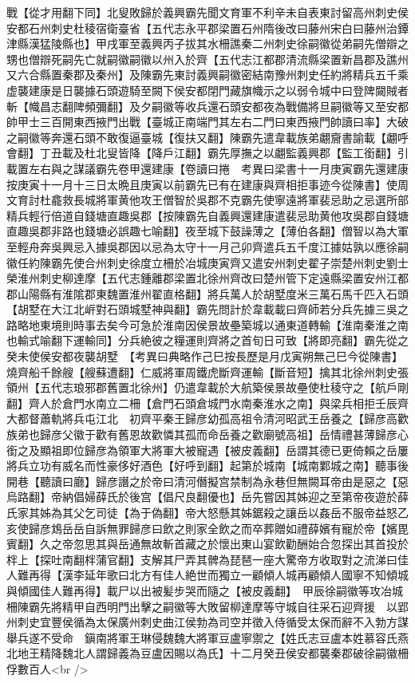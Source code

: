 戰【從才用翻下同】北叟敗歸於義興霸先聞文育軍不利辛未自表東討留高州刺史侯安都石州刺史杜稜宿衛臺省【五代志永平郡梁置石州隋後改曰藤州宋白曰藤州治鐔津縣漢猛陵縣也】甲戌軍至義興丙子拔其水柵譙秦二州刺史徐嗣徽從弟嗣先僧辯之甥也僧辯死嗣先亡就嗣徽嗣徽以州入於齊【五代志江都郡清流縣梁置新昌郡及譙州又六合縣置秦郡及秦州】及陳霸先東討義興嗣徽密結南豫州刺史任約將精兵五千乘虚襲建康是日襲據石頭遊騎至闕下侯安都閉門藏旗幟示之以弱令城中曰登陴闚賊者斬【幟昌志翻陴頻彌翻】及夕嗣徽等收兵還石頭安都夜為戰備將旦嗣徽等又至安都帥甲士三百開東西掖門出戰【臺城正南端門其左右二門曰東西掖門帥讀曰率】大破之嗣徽等奔還石頭不敢復逼臺城【復扶又翻】陳霸先遣韋載族弟翽齎書諭載【翽呼會翻】丁丑載及杜北叟皆降【降戶江翻】霸先厚撫之以翽監義興郡【監工銜翻】引載置左右與之謀議霸先卷甲還建康【卷讀曰捲　考異曰梁書十一月庚寅霸先還建康按庚寅十一月十三日太晩且庚寅以前霸先已有在建康與齊相拒事迹今從陳書】使周文育討杜龕救長城將軍黄他攻王僧智於吳郡不克霸先使寧遠將軍裴忌助之忌選所部精兵輕行倍道自錢塘直趣吳郡【按陳霸先自義興還建康遣裴忌助黄他攻吳郡自錢塘直趣吳郡非路也錢塘必誤趣七喻翻】夜至城下鼓譟薄之【薄伯各翻】僧智以為大軍至輕舟奔吳興忌入據吳郡因以忌為太守十一月己卯齊遣兵五千度江據姑孰以應徐嗣徽任約陳霸先使合州刺史徐度立柵於冶城庚寅齊又遣安州刺史翟子崇楚州刺史劉士榮淮州刺史柳達摩【五代志鍾離郡梁置北徐州齊改曰楚州管下定遠縣梁置安州江都郡山陽縣有淮隂郡東魏置淮州翟直格翻】將兵萬人於胡墅度米三萬石馬千匹入石頭【胡墅在大江北㟁對石頭城墅神與翻】霸先問計於韋載載曰齊師若分兵先據三吳之路略地東境則時事去矣今可急於淮南因侯景故壘築城以通東道轉輸【淮南秦淮之南也輸式喻翻下運輸同】分兵絶彼之糧運則齊將之首旬日可致【將即亮翻】霸先從之癸未使侯安都夜襲胡墅　【考異曰典略作己巳按長歷是月戊寅朔無己巳今從陳書】燒齊船千餘艘【艘蘇遭翻】仁威將軍周鐵虎斷齊運輸【斷音短】擒其北徐州刺史張領州【五代志琅邪郡舊置北徐州】仍遣韋載於大航築侯景故壘使杜稜守之【航戶剛翻】齊人於倉門水南立二柵【倉門石頭倉城門水南秦淮水之南】與梁兵相拒壬辰齊大都督蕭軌將兵屯江北　初齊平秦王歸彦幼孤高祖令清河昭武王岳養之【歸彦高歡族弟也歸彦父徽于歡有舊恩故歡憐其孤而命岳養之歡廟號高祖】岳情禮甚薄歸彦心銜之及顯祖即位歸彦為領軍大將軍大被寵遇【被皮義翻】岳謂其德已更倚賴之岳屢將兵立功有威名而性豪侈好酒色【好呼到翻】起第於城南【城南鄴城之南】聽事後開巷【聽讀曰廳】歸彦譖之於帝曰清河僭擬宫禁制為永巷但無闕耳帝由是惡之【惡烏路翻】帝納倡婦薛氏於後宫【倡尺良翻優也】岳先嘗因其姊迎之至第帝夜遊於薛氏家其姊為其父乞司徒【為于偽翻】帝大怒懸其姊鋸殺之讓岳以姦岳不服帝益怒乙亥使歸彦鴆岳岳自訴無罪歸彦曰飲之則家全飲之而卒葬贈如禮薛嬪有寵於帝【嬪毘賓翻】久之帝忽思其與岳通無故斬首藏之於懷出東山宴飲勸酬始合忽探出其首投於柈上【探吐南翻柈蒲官翻】支解其尸弄其髀為琵琶一座大驚帝方收取對之流涕曰佳人難再得【漢李延年歌曰北方有佳人絶世而獨立一顧傾人城再顧傾人國寧不知傾城與傾國佳人難再得】載尸以出被髪步哭而隨之【被皮義翻】　甲辰徐嗣徽等攻冶城柵陳霸先將精甲自西明門出擊之嗣徽等大敗留柳達摩等守城自往采石迎齊援　以郢州刺史宜豐侯循為太保廣州刺史曲江侯勃為司空并徵入侍循受太保而辭不入勃方謀舉兵遂不受命　鎭南將軍王琳侵魏魏大將軍豆盧寧禦之【姓氏志豆盧本姓慕容氏燕北地王精降魏北人謂歸義為豆盧因賜以為氏】十二月癸丑侯安都襲秦郡破徐嗣徽柵俘數百人<br />
